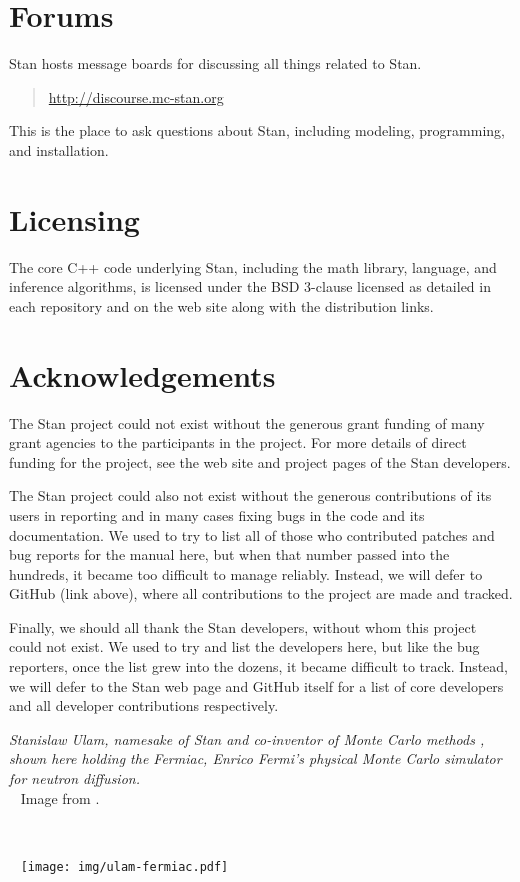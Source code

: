\section*{Forums}

Stan hosts message boards for discussing all things
related to Stan.  
%
\begin{quote}
\url{http://discourse.mc-stan.org}
\end{quote}
%
This is the place to ask questions about Stan, including modeling,
programming, and installation.


\section*{Licensing}

The core C++ code underlying Stan, including the math library,
language, and inference algorithms, is licensed under the BSD 3-clause
licensed as detailed in each repository and on the web site along
with the distribution links.


\section*{Acknowledgements}

The Stan project could not exist without the generous grant
funding of many grant agencies to the participants in the project.
For more details of direct funding for the project, see the web site
and project pages of the Stan developers.

The Stan project could also not exist without the generous
contributions of its users in reporting and in many cases fixing bugs
in the code and its documentation.  We used to try to list all of
those who contributed patches and bug reports for the manual here, but
when that number passed into the hundreds, it became too difficult to
manage reliably.  Instead, we will defer to GitHub (link above), where
all contributions to the project are made and tracked.

Finally, we should all thank the Stan developers, without whom this
project could not exist.  We used to try and list the developers here,
but like the bug reporters, once the list grew into the dozens, it
became difficult to track.  Instead, we will defer to the Stan web
page and GitHub itself for a list of core developers and all developer
contributions respectively.

\vfill
\begin{center}
\hfill
\begin{minipage}[b]{2in}
  \footnotesize {\it Stanislaw Ulam, namesake of Stan and co-inventor
    of Monte Carlo methods \citep{MetropolisUlam:1949}, shown here
    holding the Fermiac, Enrico Fermi's physical Monte Carlo simulator
    for neutron diffusion.}
  \\[3pt] \mbox{ } \hfill
  {\scriptsize Image from \citep{Giesler:2000}.}
\end{minipage} \ \ \ \ \
\begin{minipage}[b]{1.5in} \mbox{ } \hfill
  \texttt{[image: img/ulam-fermiac.pdf]}
\end{minipage}
\end{center}
